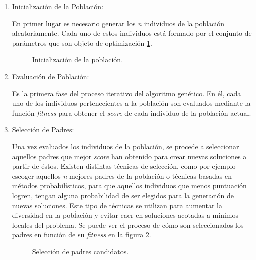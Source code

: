             \begin{enumerate}
                \item Inicialización de la Población:

                        En primer lugar es necesario generar los \textit{n} individuos de la población aleatoriamente. Cada uno de estos individuos está formado por el conjunto de parámetros que son objeto de optimización \ref{InitialPopulation}.

                        \begin{figure}[h]
                            \centering
                            
                            \caption{Inicialización de la población.}
                            \label{InitialPopulation}
                        \end{figure}

                \item Evaluación de Población:

                        Es la primera fase del proceso iterativo del algoritmo genético. En él, cada uno de los individuos pertenecientes a la población son evaluados mediante la función \textit{fitness} para obtener el \textit{score} de cada individuo de la población actual.

                \item Selección de Padres:

                        Una vez evaluados los individuos de la población, se procede a seleccionar aquellos padres que mejor \textit{score} han obtenido para crear nuevas soluciones a partir de éstos. Existen distintas técnicas de selección, como por ejemplo escoger aquellos \textit{n} mejores padres de la población o técnicas basadas en métodos probabilísticos, para que aquellos individuos que menos puntuación logren, tengan alguna probabilidad de ser elegidos para la generación de nuevas soluciones. Este tipo de técnicas se utilizan para aumentar la diversidad en la pobĺación y evitar caer en soluciones acotadas a mínimos locales del problema. Se puede ver el proceso de cómo son seleccionados los padres en función de su \textit{fitness} en la figura \ref{FitnessFunction}.

                        \begin{figure}[h]
                            \centering
                            
                            \caption{Selección de padres candidatos.}
                            \label{FitnessFunction}
                        \end{figure}


\end{enumerate}
